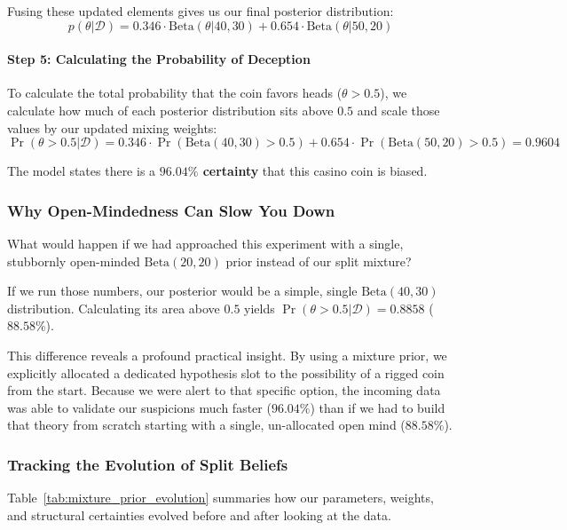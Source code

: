 \documentclass{article}
\begin{document}
 Fusing these updated elements gives us our final posterior distribution:
\begin{equation}
p(\theta|\mathcal{D}) = 0.346 \cdot \text{Beta}(\theta|40, 30) + 0.654 \cdot \text{Beta}(\theta|50, 20)
\end{equation}

\paragraph{Step 5: Calculating the Probability of Deception}
To calculate the total probability that the coin favors heads ($\theta > 0.5$), we calculate how much of each posterior distribution sits above $0.5$ and scale those values by our updated mixing weights:
\begin{equation}
\Pr(\theta > 0.5|\mathcal{D}) = 0.346 \cdot \Pr(\text{Beta}(40,30) > 0.5) + 0.654 \cdot \Pr(\text{Beta}(50,20) > 0.5) = \mathbf{0.9604}
\end{equation}

The model states there is a \textbf{$96.04\%$ certainty} that this casino coin is biased.

\subsubsection{Why Open-Mindedness Can Slow You Down}
What would happen if we had approached this experiment with a single, stubbornly open-minded $\text{Beta}(20,20)$ prior instead of our split mixture? 

If we run those numbers, our posterior would be a simple, single $\text{Beta}(40,30)$ distribution. Calculating its area above $0.5$ yields $\Pr(\theta > 0.5|\mathcal{D}) = \mathbf{0.8858}$ ($88.58\%$). 

This difference reveals a profound practical insight. By using a mixture prior, we explicitly allocated a dedicated hypothesis slot to the possibility of a rigged coin from the start. Because we were alert to that specific option, the incoming data was able to validate our suspicions much faster ($96.04\%$) than if we had to build that theory from scratch starting with a single, un-allocated open mind ($88.58\%$).

\subsubsection{Tracking the Evolution of Split Beliefs}
Table~\ref{tab:mixture_prior_evolution} summaries how our parameters, weights, and structural certainties evolved before and after looking at the data.
\end{document}
